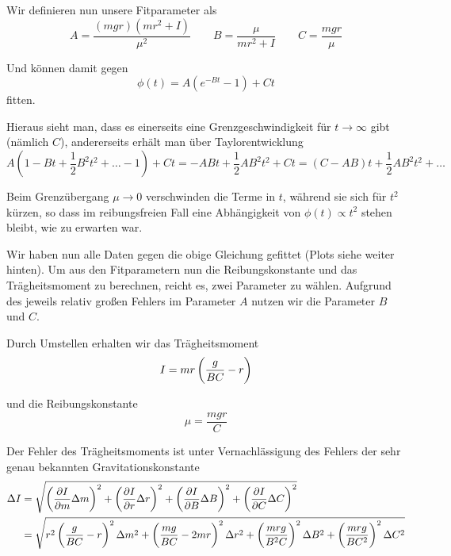 \documentclass[a4paper,german,12pt,smallheadings]{scrartcl}
\begin{document}
Wir definieren nun unsere Fitparameter als
\begin{equation}
  A = \frac{(mgr)(mr^2+I)}{\mu^2} \qquad
  B = \frac{\mu}{mr^2+I} \qquad
  C = \frac{mgr}{\mu}
\end{equation}

Und können damit gegen
\begin{equation}
  \phi(t) = A(e^{-Bt} -1) + Ct
\end{equation}
fitten.

Hieraus sieht man, dass es einerseits eine Grenzgeschwindigkeit für $t \to
\infty$ gibt (nämlich $C$), andererseits erhält man über Taylorentwicklung
\begin{equation}
  A(1-Bt+\frac{1}{2}B^2t^2 + \dots - 1) + Ct = -ABt+\frac{1}{2}AB^2t^2 + Ct = (C-AB)t+ \frac{1}{2}AB^2 t^2 + \dots
\end{equation}

Beim Grenzübergang $\mu \to 0$ verschwinden die Terme in $t$, während sie sich
für $t^2$ kürzen, so dass im reibungsfreien Fall eine Abhängigkeit von $\phi(t)
\propto t^2$ stehen bleibt, wie zu erwarten war.

Wir haben nun alle Daten gegen die obige Gleichung gefittet (Plots siehe weiter
hinten). Um aus den Fitparametern nun die Reibungskonstante und das
Trägheitsmoment zu berechnen, reicht es, zwei Parameter zu wählen. Aufgrund des
jeweils relativ großen Fehlers im Parameter $A$ nutzen wir die Parameter $B$
und $C$.

Durch Umstellen erhalten wir das Trägheitsmoment
\begin{equation}
  I = mr \del{\frac{g}{BC} - r}
\end{equation}

und die Reibungskonstante
\begin{equation}
  \mu = \frac{mgr}{C}
\end{equation}

Der Fehler des Trägheitsmoments ist unter Vernachlässigung des Fehlers der sehr
genau bekannten Gravitationskonstante %
\begin{align*}
  \Delta I &= \sqrt{
    \del{\frac{\partial I}{\partial m} \Delta m}^2 +
    \del{\frac{\partial I}{\partial r} \Delta r}^2 +
    \del{\frac{\partial I}{\partial B} \Delta B}^2 +
    \del{\frac{\partial I}{\partial C} \Delta C}^2
  } \\
  &= \sqrt{
    r^2\del{\frac{g}{BC} -r}^2 \Delta m^2 +
    \del{\frac{mg}{BC} - 2mr}^2 \Delta r^2 +
    \del{\frac{mrg}{B^2C}}^2 \Delta B^2 +
    \del{\frac{mrg}{BC^2}}^2 \Delta C^2
  }
\end{align*}
\end{document}
